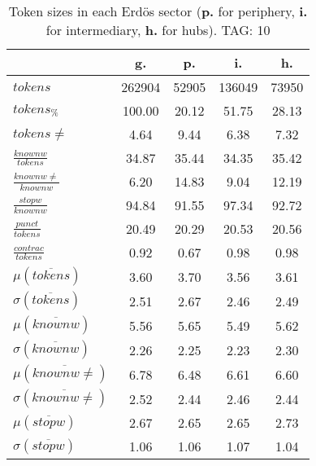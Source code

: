 \begin{table}[h!]
\begin{center}
\begin{tabular}{| l || c | c | c | c |}\hline
 & {\bf g.} & {\bf p.} & {\bf i.} & {\bf h.} \\\hline\hline
$tokens$ & 262904  & 52905  & 136049  & 73950 \\
$tokens_{\%}$ & 100.00  & 20.12  & 51.75  & 28.13 \\
$tokens \neq$ & 4.64  & 9.44  & 6.38  & 7.32 \\\hline
$\frac{knownw}{tokens}$ & 34.87  & 35.44  & 34.35  & 35.42 \\
$\frac{knownw \neq}{knownw}$ & 6.20  & 14.83  & 9.04  & 12.19 \\\hline
$\frac{stopw}{knownw}$ & 94.84  & 91.55  & 97.34  & 92.72 \\
$\frac{punct}{tokens}$ & 20.49  & 20.29  & 20.53  & 20.56 \\
$\frac{contrac}{tokens}$ & 0.92  & 0.67  & 0.98  & 0.98 \\\hline\hline
$\mu(\overline{tokens})$ & 3.60  & 3.70  & 3.56  & 3.61 \\
$\sigma(\overline{tokens})$ & 2.51  & 2.67  & 2.46  & 2.49 \\\hline
$\mu(\overline{knownw})$ & 5.56  & 5.65  & 5.49  & 5.62 \\
$\sigma(\overline{knownw})$ & 2.26  & 2.25  & 2.23  & 2.30 \\\hline
$\mu(\overline{knownw \neq})$ & 6.78  & 6.48  & 6.61  & 6.60 \\
$\sigma(\overline{knownw \neq})$ & 2.52  & 2.44  & 2.46  & 2.44 \\\hline
$\mu(\overline{stopw})$ & 2.67  & 2.65  & 2.65  & 2.73 \\
$\sigma(\overline{stopw})$ & 1.06  & 1.06  & 1.07  & 1.04 \\\hline
\end{tabular}
\caption{Token sizes in each Erd\"os sector ({{\bf p.}} for periphery, {{\bf i.}} for intermediary, {{\bf h.}} for hubs). TAG: 10}
\end{center}
\end{table}